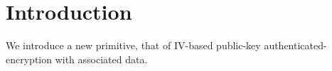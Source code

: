 \section{Introduction}
\label{sec:intro}
We introduce a new primitive, that of IV-based public-key authenticated-encryption with associated data. 

